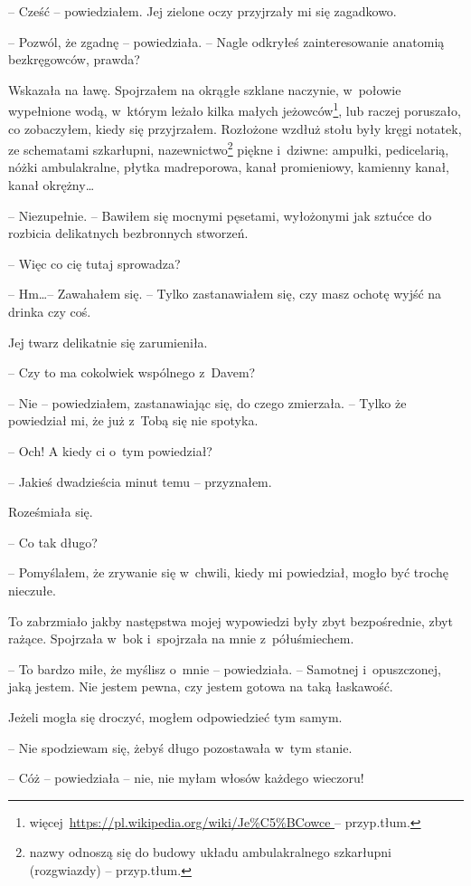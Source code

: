 \documentclass[oneside,polish,11pt,sfheadings]{mwbk}
\begin{document}
-- Cześć -- powiedziałem. Jej zielone oczy przyjrzały mi się zagadkowo.

-- Pozwól, że zgadnę -- powiedziała. -- Nagle odkryłeś zainteresowanie
anatomią bezkręgowców, prawda?

Wskazała na ławę. Spojrzałem na okrągłe szklane naczynie, w~połowie
wypełnione wodą, w~którym leżało kilka małych
jeżowców\footnote{więcej~\url{https://pl.wikipedia.org/wiki/Je\%C5\%BCowce
} -- przyp.tłum.}, lub raczej poruszało, co zobaczyłem, kiedy się
przyjrzałem. Rozłożone wzdłuż stołu były kręgi notatek, ze schematami
szkarłupni, nazewnictwo\footnote{nazwy odnoszą się do budowy układu ambulakralnego szkarłupni (rozgwiazdy) -- przyp.tłum.}  piękne i~dziwne: ampułki, pedicelarią, nóżki
ambulakralne, płytka madreporowa, kanał promieniowy, kamienny kanał,
kanał okrężny\ldots 

-- Niezupełnie. -- Bawiłem się mocnymi pęsetami, wyłożonymi jak sztućce do
rozbicia delikatnych bezbronnych stworzeń.

-- Więc co cię tutaj sprowadza?

-- Hm\ldots -- Zawahałem się. -- Tylko zastanawiałem się, czy masz ochotę
wyjść na drinka czy coś.

Jej twarz delikatnie się zarumieniła.

-- Czy to ma cokolwiek wspólnego z~Davem?

-- Nie -- powiedziałem, zastanawiając się, do czego zmierzała. -- Tylko że
powiedział mi, że już z~Tobą się nie spotyka.

-- Och! A kiedy ci o~tym powiedział?

-- Jakieś dwadzieścia minut temu -- przyznałem.

Roześmiała się. 

-- Co tak długo?

-- Pomyślałem, że zrywanie się w~chwili, kiedy mi powiedział, mogło być
trochę nieczułe.

To zabrzmiało jakby następstwa mojej wypowiedzi były zbyt bezpośrednie,
zbyt rażące. Spojrzała w~bok i~spojrzała na mnie z~półuśmiechem.

-- To bardzo miłe, że myślisz o~mnie -- powiedziała. -- Samotnej i~opuszczonej, jaką jestem. Nie jestem pewna, czy jestem gotowa na taką
łaskawość.

Jeżeli mogła się droczyć, mogłem odpowiedzieć tym samym. 

-- Nie
spodziewam się, żebyś długo pozostawała w~tym stanie.

-- Cóż -- powiedziała -- nie, nie myłam włosów każdego wieczoru!
\end{document}
